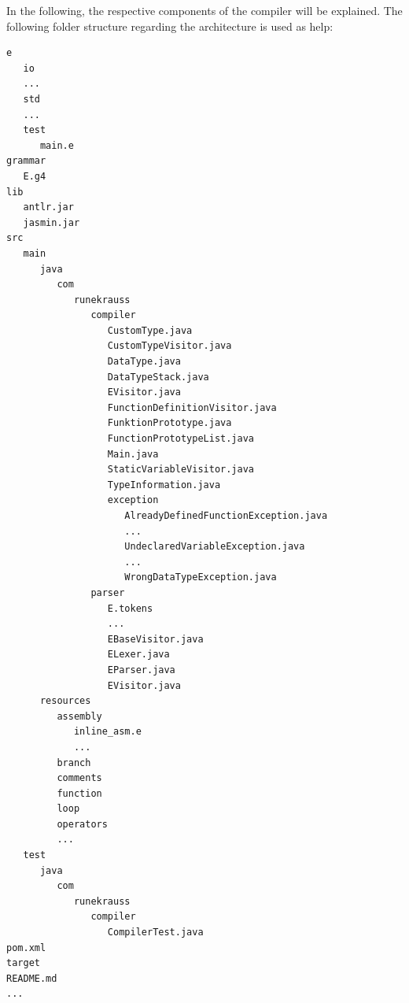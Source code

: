 In the following, the respective components of the compiler will be explained. The following folder structure regarding the architecture is used as help:

\begin{verbatim}
e
   io
   ...
   std
   ...
   test
      main.e
grammar
   E.g4
lib
   antlr.jar
   jasmin.jar
src
   main
      java
         com
            runekrauss
               compiler
                  CustomType.java
                  CustomTypeVisitor.java
                  DataType.java
                  DataTypeStack.java
                  EVisitor.java
                  FunctionDefinitionVisitor.java
                  FunktionPrototype.java
                  FunctionPrototypeList.java
                  Main.java
                  StaticVariableVisitor.java
                  TypeInformation.java
                  exception
                     AlreadyDefinedFunctionException.java
                     ...
                     UndeclaredVariableException.java
                     ...
                     WrongDataTypeException.java
               parser
                  E.tokens
                  ...
                  EBaseVisitor.java
                  ELexer.java
                  EParser.java
                  EVisitor.java
      resources
         assembly
            inline_asm.e
            ...
         branch
         comments
         function
         loop
         operators
         ...
   test
      java
         com
            runekrauss
               compiler
                  CompilerTest.java
pom.xml
target
README.md
...
\end{verbatim}

